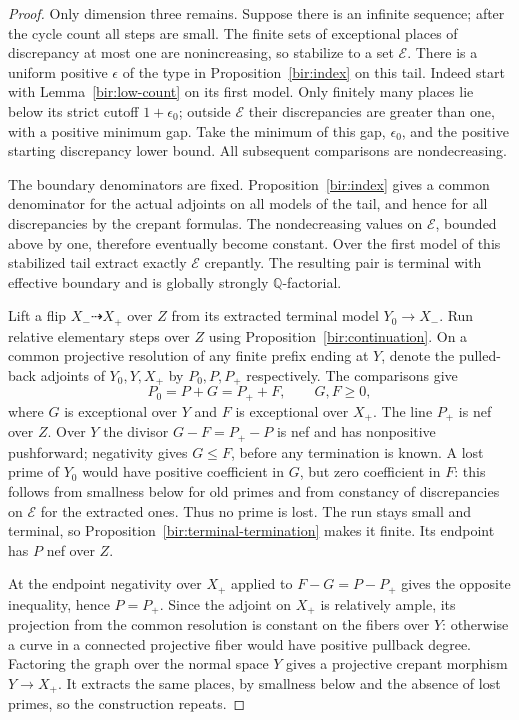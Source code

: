 \documentclass[11pt,letterpaper]{article}
\theoremstyle{definition}
\theoremstyle{remark}
\begin{document}
\begin{proof}
Only dimension three remains.  Suppose there is an infinite
sequence; after the cycle count all steps are small.  The finite sets
of exceptional places of discrepancy at most one are nonincreasing,
so stabilize to a set $\mathcal E$.  There is a uniform positive
$\epsilon$ of the type in Proposition~\ref{bir:index} on this tail.
Indeed start with Lemma~\ref{bir:low-count} on its first model.  Only
finitely many places lie below its strict cutoff $1+\epsilon_0$;
outside $\mathcal E$ their discrepancies are greater than one, with
a positive minimum gap.  Take the minimum of this gap,
$\epsilon_0$, and the positive starting discrepancy lower bound.
All subsequent comparisons are nondecreasing.

The boundary denominators are fixed.  Proposition~\ref{bir:index}
gives a common denominator for the actual adjoints on all models of
the tail, and hence for all discrepancies by the crepant formulas.
The nondecreasing values on $\mathcal E$, bounded above by one,
therefore eventually become constant.  Over the first model of this
stabilized tail extract exactly $\mathcal E$ crepantly.  The
resulting pair is terminal with effective boundary and is globally
strongly $\mathbb{Q}$-factorial.

Lift a flip $X_-\dashrightarrow X_+$ over $Z$ from its extracted
terminal model $Y_0\to X_-$.  Run relative elementary steps over $Z$
using Proposition~\ref{bir:continuation}.  On a common projective
resolution of any finite prefix ending at $Y$, denote the pulled-back
adjoints of $Y_0,Y,X_+$ by $P_0,P,P_+$ respectively.  The comparisons
give
\begin{equation}
 P_0=P+G=P_++F,
 \qquad G,F\geq0,
 \label{bir:terminal-lift}
\end{equation}
where $G$ is exceptional over $Y$ and $F$ is exceptional over $X_+$.
The line $P_+$ is nef over $Z$.  Over $Y$ the divisor
$G-F=P_+-P$ is nef and has nonpositive pushforward; negativity gives
$G\leq F$, before any termination is known.  A lost prime of $Y_0$
would have positive coefficient in $G$, but zero coefficient in $F$:
this follows from smallness below for old primes and from constancy
of discrepancies on $\mathcal E$ for the extracted ones.  Thus no
prime is lost.  The run stays small and terminal, so
Proposition~\ref{bir:terminal-termination} makes it finite.  Its
endpoint has $P$ nef over $Z$.

At the endpoint negativity over $X_+$ applied to $F-G=P-P_+$ gives
the opposite inequality, hence $P=P_+$.  Since the adjoint on $X_+$
is relatively ample, its projection from the common resolution is
constant on the fibers over $Y$: otherwise a curve in a connected
projective fiber would have positive pullback degree.  Factoring the
graph over the normal space $Y$ gives a projective crepant morphism
$Y\to X_+$.  It extracts the same places, by smallness below and the
absence of lost primes, so the construction repeats.


\end{proof}
\end{document}
